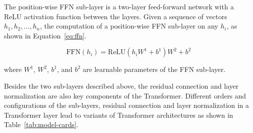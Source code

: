 The position-wise FFN sub-layer is a two-layer feed-forward network with a ReLU activation function between the layers.
Given a sequence of vectors \(h_1, h_2, \ldots, h_n\), the computation of a position-wise FFN sub-layer on any \(h_i\), as shown in Equation~\ref{eq:ffn}.

\begin{equation}
	\text{FFN}(h_i) = \text{ReLU}(h_{i}W^1 + b^1)W^2 + b^2
	\label{eq:ffn}
\end{equation}

\noindent where \(W^1\), \(W^2\), \(b^1\), and \(b^2\) are learnable parameters of the FFN sub-layer.

Besides the two sub-layers described above, the residual connection and layer normalization are also key components of the
Transformer.
Different orders and configurations of the sub-layers, residual connection and layer normalization in a Transformer layer lead to variants of Transformer architectures as shown in Table~\ref{tab:model-cards}.

